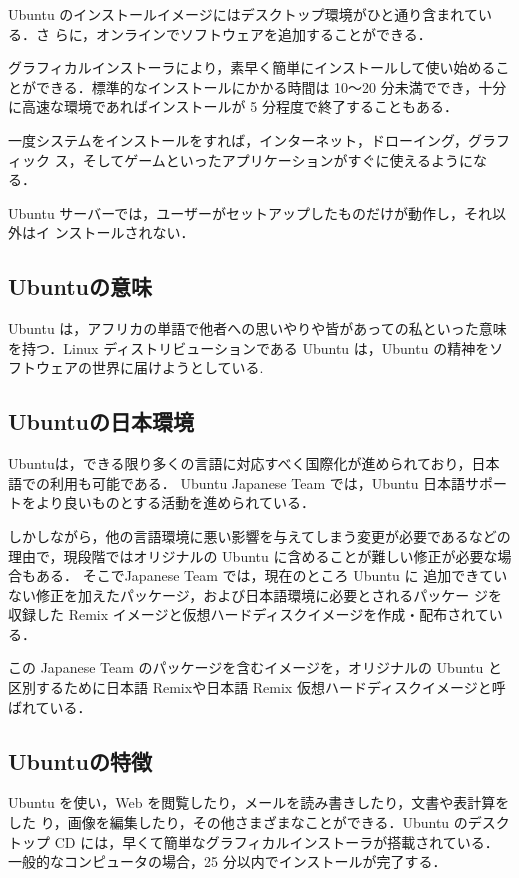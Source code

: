 Ubuntu のインストールイメージにはデスクトップ環境がひと通り含まれている．さ らに，オンラインでソフトウェアを追加することができる． 

グラフィカルインストーラにより，素早く簡単にインストールして使い始めることができる．標準的なインストールにかかる時間は 10〜20 分未満ででき，十分に高速な環境であればインストールが 5 分程度で終了することもある．
  
一度システムをインストールをすれば，インターネット，ドローイング，グラフィック ス，そしてゲームといったアプリケーションがすぐに使えるようになる．

Ubuntu サーバーでは，ユーザーがセットアップしたものだけが動作し，それ以外はイ ンストールされない\cite{ubuntu}．

\subsection{Ubuntuの意味}
Ubuntu は，アフリカの単語で他者への思いやりや皆があっての私といった意味を持つ．Linux ディストリビューションである Ubuntu は，Ubuntu の精神をソフトウェアの世界に届けようとしている\cite{ubuntu}.

\clearpage

\subsection{Ubuntuの日本環境}
Ubuntuは，できる限り多くの言語に対応すべく国際化が進められており，日本語での利用も可能である． Ubuntu Japanese Team では，Ubuntu 日本語サポートをより良いものとする活動を進められている．

しかしながら，他の言語環境に悪い影響を与えてしまう変更が必要であるなどの理由で，現段階ではオリジナルの Ubuntu に含めることが難しい修正が必要な場合もある． そこでJapanese Team では，現在のところ Ubuntu に 追加できていない修正を加えたパッケージ，および日本語環境に必要とされるパッケー ジを収録した Remix イメージと仮想ハードディスクイメージを作成・配布されている． 

この Japanese Team のパッケージを含むイメージを，オリジナルの Ubuntu と区別するために日本語 Remixや日本語 Remix 仮想ハードディスクイメージと呼ばれている\cite{ubuntu}．

\subsection{Ubuntuの特徴}
Ubuntu を使い，Web を閲覧したり，メールを読み書きしたり，文書や表計算をした り，画像を編集したり，その他さまざまなことができる．Ubuntu のデスクトップ CD には，早くて簡単なグラフィカルインストーラが搭載されている．一般的なコンピュータの場合，25 分以内でインストールが完了する．

